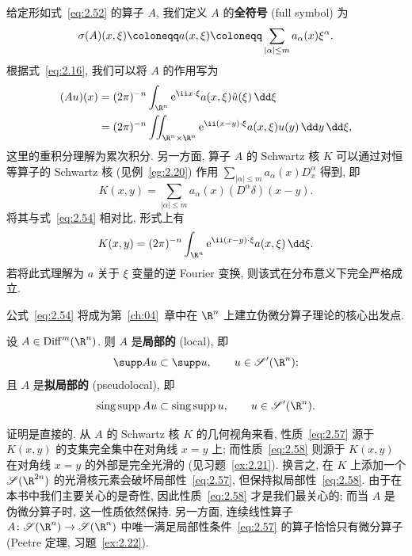 给定形如式~\eqref{eq:2.52} 的算子 $A$, 我们定义 $A$ 的\textbf{全符号} (full symbol) 为
\begin{equation}\label{eq:2.53}
    \sigma(A)(x, \xi) \defeq a(x, \xi) \defeq \sum_{|\alpha| \le m} a_\alpha(x) \xi^\alpha.
\end{equation}
根据式~\eqref{eq:2.16}, 我们可以将 $A$ 的作用写为
\begin{equation}\label{eq:2.54}
    \begin{aligned}
        (A u)(x) &= (2\pi)^{-n} \int_{\R^n} \ee^{\ii x \cdot \xi} a(x, \xi) \hat{u}(\xi) \,\dd\xi \\
        &= (2\pi)^{-n} \iint_{\R^n \times \R^n} \ee^{\ii (x-y) \cdot \xi} a(x, \xi) u(y) \,\dd y \,\dd\xi,
    \end{aligned}
\end{equation}
这里的重积分理解为累次积分. 另一方面, 算子 $A$ 的 Schwartz 核 $K$ 可以通过对恒等算子的 Schwartz 核 (见例~\ref{eg:2.20}) 作用 $\sum_{|\alpha| \le m} a_\alpha(x) D_x^\alpha$ 得到, 即
\begin{equation}\label{eq:2.55}
    K(x, y) = \sum_{|\alpha| \le m} a_\alpha(x) (D^\alpha \delta)(x - y).
\end{equation}
将其与式~\eqref{eq:2.54} 相对比, 形式上有
\begin{equation}\label{eq:2.56}
    K(x, y) = (2\pi)^{-n} \int_{\R^n} \ee^{\ii (x-y) \cdot \xi} a(x, \xi) \,\dd\xi.
\end{equation}
若将此式理解为 $a$ 关于 $\xi$ 变量的逆 Fourier 变换, 则该式在分布意义下完全严格成立.

公式~\eqref{eq:2.54} 将成为第~\ref{ch:04}~章中在 $\R^n$ 上建立伪微分算子理论的核心出发点.

\begin{proposition}[微分算子的局部性与拟局部性]\label{prop:2.22}
设 $A \in \Diff^m(\R^n)$. 则 $A$ 是\textbf{局部的} (local), 即
\begin{equation}\label{eq:2.57}
    \supp A u \subset \supp u, \qquad u \in \TempDistr(\R^n);
\end{equation}
且 $A$ 是\textbf{拟局部的} (pseudolocal), 即
\begin{equation}\label{eq:2.58}
    \singsupp A u \subset \singsupp u, \qquad u \in \TempDistr(\R^n).
\end{equation}
\end{proposition}

证明是直接的. 从 $A$ 的 Schwartz 核 $K$ 的几何视角来看, 性质~\eqref{eq:2.57} 源于 $K(x, y)$ 的支集完全集中在对角线 $x = y$ 上; 而性质~\eqref{eq:2.58} 则源于 $K(x, y)$ 在对角线 $x = y$ 的外部是完全光滑的 (见习题~\ref{ex:2.21}). 换言之, 在 $K$ 上添加一个 $\Schwartz(\R^{2n})$ 的光滑核元素会破坏局部性~\eqref{eq:2.57}, 但保持拟局部性~\eqref{eq:2.58}. 由于在本书中我们主要关心的是奇性, 因此性质~\eqref{eq:2.58} 才是我们最关心的; 而当 $A$ 是伪微分算子时, 这一性质依然保持. 另一方面, 连续线性算子 $A \colon \Schwartz(\R^n) \to \Schwartz(\R^n)$ 中唯一满足局部性条件~\eqref{eq:2.57} 的算子恰恰只有微分算子 (Peetre 定理, 习题~\ref{ex:2.22}).

